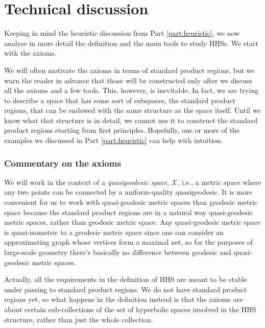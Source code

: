 \documentclass[11pt,oneside]{amsart}
\newcounter{ax}
\theoremstyle{definition}
\newcommand{\cuco}[1]{{\mathcal #1}}
\begin{document}



\part{Technical discussion}\label{part:technical}

Keeping in mind the heuristic discussion from Part \ref{part:heuristic}, we now analyse in more detail the definition and the main tools to study HHSs. We start with the axioms.

We will often motivate the axioms in terms of standard product regions, but we warn the reader in advance that those will be constructed only after we discuss all the axioms and a few tools. This, however, is inevitable. In fact, we are trying to describe a space that has some sort of subspaces, the standard product regions, that can be endowed with the same structure as the space itself. Until we know what that structure is in detail, we cannot use it to construct the standard product regions starting from first principles. Hopefully, one or more of the examples we discussed in Part \ref{part:heuristic} can help with intuition.

\section{Commentary on the axioms}
 
We will work in the context of a \emph{quasigeodesic space},  $\cuco X$, 
i.e., a metric space where any two
points can be connected by a uniform-quality quasigeodesic. It is more convenient for us to work with quasi-geodesic metric spaces than geodesic metric space because the standard product regions are in a natural way quasi-geodesic metric spaces, rather than geodesic metric space. Any quasi-geodesic metric space is quasi-isometric to a geodesic metric space since one can consider an approximating graph whose vertices form a maximal net, so for the purposes of large-scale geometry there's basically no difference between geodesic and quasi-geodesic metric spaces.

Actually, all the requirements in the definition of HHS are meant to be stable under passing to standard product regions. We do not have standard product regions yet, so what happens in the definition instead is that the axioms are about certain sub-collections of the set of hyperbolic spaces involved in the HHS structure, rather than just the whole collection.
\end{document}
